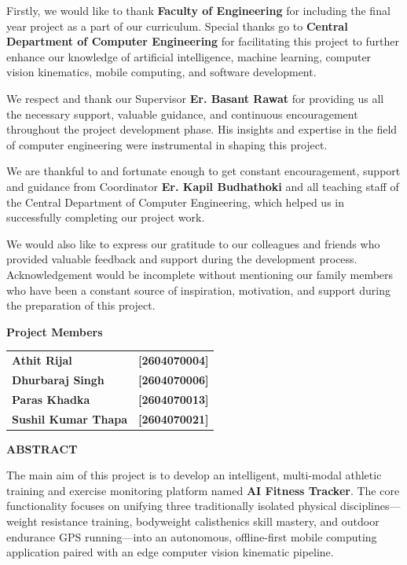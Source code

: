 \documentclass[12pt,a4paper]{report}
\begin{document}
Firstly, we would like to thank \textbf{Faculty of Engineering} for including the final year project as a part of our curriculum. Special thanks go to \textbf{Central Department of Computer Engineering} for facilitating this project to further enhance our knowledge of artificial intelligence, machine learning, computer vision kinematics, mobile computing, and software development.

We respect and thank our Supervisor \textbf{Er. Basant Rawat} for providing us all the necessary support, valuable guidance, and continuous encouragement throughout the project development phase. His insights and expertise in the field of computer engineering were instrumental in shaping this project.

We are thankful to and fortunate enough to get constant encouragement, support and guidance from Coordinator \textbf{Er. Kapil Budhathoki} and all teaching staff of the Central Department of Computer Engineering, which helped us in successfully completing our project work.

We would also like to express our gratitude to our colleagues and friends who provided valuable feedback and support during the development process. Acknowledgement would be incomplete without mentioning our family members who have been a constant source of inspiration, motivation, and support during the preparation of this project.

\vspace{1.2cm}

\textbf{Project Members}\\[6pt]
\begin{tabular}{ll}
\textbf{Athit Rijal} & \textbf{[2604070004]} \\[4pt]
\textbf{Dhurbaraj Singh} & \textbf{[2604070006]} \\[4pt]
\textbf{Paras Khadka} & \textbf{[2604070013]} \\[4pt]
\textbf{Sushil Kumar Thapa} & \textbf{[2604070021]} \\
\end{tabular}

\newpage

\thispagestyle{plain}
\begin{center}
    {\fontsize{15pt}{18pt}\bfseries ABSTRACT}\\[1.2cm]
\end{center}

The main aim of this project is to develop an intelligent, multi-modal athletic training and exercise monitoring platform named \textbf{AI Fitness Tracker}. The core functionality focuses on unifying three traditionally isolated physical disciplines---weight resistance training, bodyweight calisthenics skill mastery, and outdoor endurance GPS running---into an autonomous, offline-first mobile computing application paired with an edge computer vision kinematic pipeline.
\end{document}
